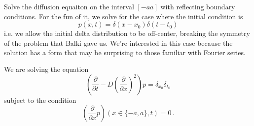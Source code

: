 

Solve the diffusion equaiton on the interval $[-a a]$ with reflecting boundary conditions.
For the fun of it, we solve for the case where the initial condition is
\begin{equation*}
  p(x, t) = \delta(x - x_0) \delta(t - t_0)
\end{equation*}
i.e. we allow the initial delta distribution to be off-center, breaking the symmetry of the problem that Balki gave us.
We're interested in this case because the solution has a form that may be surprising to those familiar with Fourier series.


We are solving the equation
\begin{equation*}
  \left( \frac{\partial}{\partial t} - D \left( \frac{\partial}{\partial x} \right)^2 \right)
  p = \delta_{x_0} \delta_{t_0}
\end{equation*}
subject to the condition
\begin{equation*}
  \left( \frac{\partial}{\partial x} p \right)(x\in \{-a, a\}, t) = 0
  \, .
\end{equation*}

